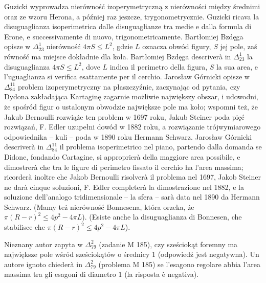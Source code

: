 Guzicki \cite[s. 169, 170]{guzicki_2021} wyprowadza nierówność izoperymetryczną z nierówności między średnimi oraz ze wzoru Herona, a później \cite[s. 362]{guzicki_2021} raz jeszcze, trygonometrycznie. %
Guzicki \cite[p. 169, 170]{guzicki_2021} ricava la disuguaglianza isoperimetrica dalle disuguaglianze tra medie e dalla formula di Erone, e successivamente \cite[p. 362]{guzicki_2021} di nuovo, trigonometricamente. %
Bartłomiej Bzdęga opisze w $\Delta_{23}^1$ nierówność $4 \pi S \le L^2$, gdzie $L$ oznacza obwód figury, $S$ jej pole, zaś równość ma miejsce dokładnie dla koła. %
Bartłomiej Bzdęga descriverà in $\Delta_{23}^1$ la disuguaglianza $4 \pi S \le L^2$, dove $L$ indica il perimetro della figura, $S$ la sua area, e l'uguaglianza si verifica esattamente per il cerchio. %
Jarosław Górnicki opisze w $\Delta_{84}^{11}$ problem izoperymetryczny na płaszczyźnie, zaczynając od pytania, czy Dydona zakładająca Kartaginę zagarnie możliwie największy obszar, i udowodni, że spośród figur o ustalonym obwodzie największe pole ma koło; wspomni też, że Jakub Bernoulli rozwiąże ten problem w 1697 roku, Jakub Steiner poda pięć rozwiązań, F. Edler uzupełni dowód w 1882 roku, a rozwiązanie trójwymiarowego odpowiednika -- kuli -- poda w 1890 roku Hermann Schwarz. %
Jarosław Górnicki descriverà in $\Delta_{84}^{11}$ il problema isoperimetrico nel piano, partendo dalla domanda se Didone, fondando Cartagine, si approprierà della maggiore area possibile, e dimostrerà che tra le figure di perimetro fissato il cerchio ha l'area massima; ricorderà inoltre che Jakob Bernoulli risolverà il problema nel 1697, Jakob Steiner ne darà cinque soluzioni, F. Edler completerà la dimostrazione nel 1882, e la soluzione dell'analogo tridimensionale -- la sfera -- sarà data nel 1890 da Hermann Schwarz. %
(Mamy też nierówność Bonnesena, która orzeka, że $\pi (R-r)^2 \le 4p^2 - 4 \pi L$). %
(Esiste anche la disuguaglianza di Bonnesen, che stabilisce che $\pi (R-r)^2 \le 4p^2 - 4 \pi L$). %

Nieznany autor zapyta w $\Delta_{79}^{2}$ (zadanie M 185), czy sześciokąt foremny ma największe pole wśród sześciokątów o średnicy $1$ (odpowiedź jest negatywna). %
Un autore ignoto chiederà in $\Delta_{79}^{2}$ (problema M 185) se l'esagono regolare abbia l'area massima tra gli esagoni di diametro $1$ (la risposta è negativa). %

